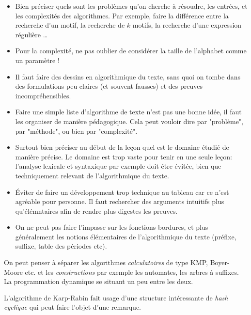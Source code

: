 \documentclass{agregfiche}
\begin{document}
\begin{itemize}
    \item Bien préciser quels sont les problèmes qu'on cherche 
        à résoudre, les entrées, et les complexités des algorithmes.
        Par exemple, faire la différence entre la recherche 
        d'un motif, la recherche de $k$ motifs, la recherche 
        d'une expression régulière \dots

    \item Pour la complexité, ne pas oublier de 
        considérer la taille de l'alphabet comme un paramètre !

    \item Il faut faire des dessins en algorithmique du texte, sans 
        quoi on tombe dans des formulations peu claires (et souvent 
        fausses) et des preuves incompréhensibles.

    \item Faire une simple liste d'algorithme de texte n'est pas 
        une bonne idée, il faut les organiser de manière pédagogique.
        Cela peut vouloir dire par "problème", par "méthode", ou 
        bien par "complexité".

    \item Surtout bien préciser au début de la leçon quel est le 
        domaine étudié de manière précise. Le domaine est trop vaste 
        pour tenir en une seule leçon: l'analyse lexicale et 
        syntaxique par exemple doit être évitée, bien que techniquement
        relevant de l'algorithmique du texte.

    \item Éviter de faire un développement trop technique au tableau 
        car ce n'est agréable pour personne. Il faut rechercher 
        des arguments intuitifs plus qu'élémntaires afin de rendre 
        plus digestes les preuves.

    \item On ne peut pas faire l'impasse sur les fonctions bordures,
        et plus généralement les notions élémentaires de l'algorithmique
        du texte (préfixe, suffixe, table des périodes etc).
\end{itemize}

\secidees

On peut penser à séparer les algorithmes \emph{calculatoires}
de type KMP, Boyer-Moore etc. et les \emph{constructions}
par exemple les automates, les arbres à suffixes. La programmation
dynamique se situant un peu entre les deux.

L'algorithme de Karp-Rabin fait usage d'une structure intéressante
de \emph{hash cyclique} qui peut faire l'objet d'une remarque.
\end{document}
